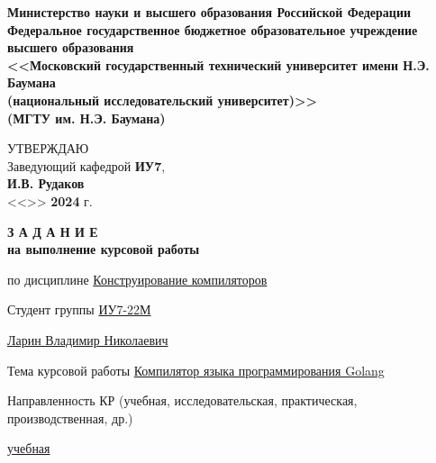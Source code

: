 \thispagestyle{empty}
\begin{center}
    \fontsize{11pt}{0.3\baselineskip}\selectfont \textbf{Министерство науки и высшего образования Российской Федерации \\ Федеральное государственное бюджетное образовательное учреждение \\ высшего образования \\ <<Московский государственный технический университет имени Н.Э. Баумана \\ (национальный исследовательский университет)>> \\ (МГТУ им. Н.Э. Баумана)}
    \makebox[\linewidth]{\rule{\textwidth}{3pt}}
    \begin{flushright}
        \fontsize{11pt}{0.5\baselineskip}\selectfont
            УТВЕРЖДАЮ \\ Заведующий кафедрой \textbf{ИУ7}, \\
            \uline{\mbox{\hspace*{2cm}}}
            \textbf{И.В. Рудаков} \\
            <<\uline{\mbox{\hspace*{1cm}}}>>
            \uline{\mbox{\hspace*{2.5cm}}}
            \textbf{2024} г.
    \end{flushright}
\end{center}


\begin{center}
    \fontsize{18pt}{0.6\baselineskip}\selectfont \textbf{З А Д А Н И Е}\\
    \fontsize{16pt}{0.6\baselineskip}\selectfont \textbf{на выполнение курсовой работы}
\end{center}

\normalsize

\begingroup
\fontsize{12pt}{0.6\baselineskip}\selectfont
\setlength{\parskip}{0.1em}
\setlength{\parindent}{0em}
по дисциплине \uline{\hfill Конструирование компиляторов \hfill}

Студент группы \uline{\hfill ИУ7-22М \hfill}

\uline{\hfill Ларин Владимир Николаевич \hfill}

Тема курсовой работы \uline{Компилятор языка программирования Golang\hfill}

Направленность КР (учебная, исследовательская, практическая, производственная, др.)

\uline{\hfill учебная \hfill}

